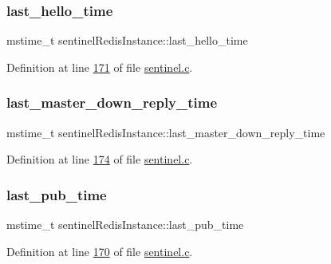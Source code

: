 \subsubsection{\texorpdfstring{last\+\_\+hello\+\_\+time}{last\_hello\_time}}
{\footnotesize\ttfamily mstime\+\_\+t sentinel\+Redis\+Instance\+::last\+\_\+hello\+\_\+time}



Definition at line \hyperlink{sentinel_8c_source_l00171}{171} of file \hyperlink{sentinel_8c_source}{sentinel.\+c}.

\mbox{\label{structsentinelRedisInstance_ad8c2a9b8b502bb7e1785491f287417bd}} 
\subsubsection{\texorpdfstring{last\+\_\+master\+\_\+down\+\_\+reply\+\_\+time}{last\_master\_down\_reply\_time}}
{\footnotesize\ttfamily mstime\+\_\+t sentinel\+Redis\+Instance\+::last\+\_\+master\+\_\+down\+\_\+reply\+\_\+time}



Definition at line \hyperlink{sentinel_8c_source_l00174}{174} of file \hyperlink{sentinel_8c_source}{sentinel.\+c}.

\mbox{\label{structsentinelRedisInstance_a7cb4beb806889669d2d124c8379bec7d}} 
\subsubsection{\texorpdfstring{last\+\_\+pub\+\_\+time}{last\_pub\_time}}
{\footnotesize\ttfamily mstime\+\_\+t sentinel\+Redis\+Instance\+::last\+\_\+pub\+\_\+time}



Definition at line \hyperlink{sentinel_8c_source_l00170}{170} of file \hyperlink{sentinel_8c_source}{sentinel.\+c}.

